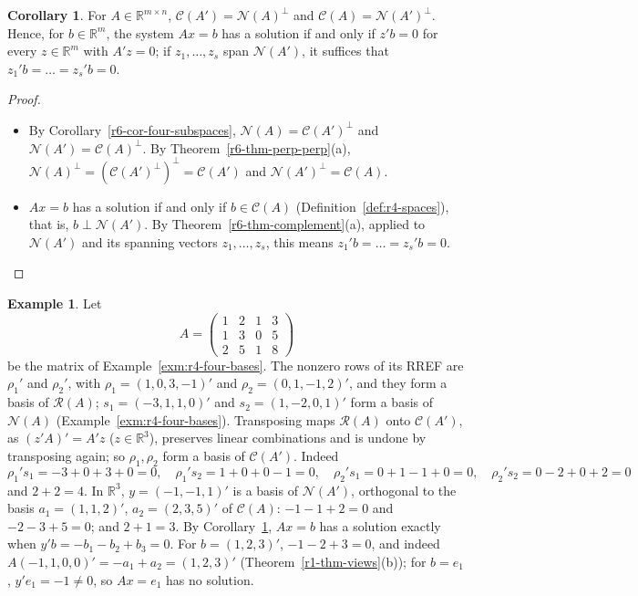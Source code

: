 \documentclass[12pt]{article}
\newcommand{\R}{\mathbb R}
\theoremstyle{definition}
\newtheorem{corollary}[theorem]{Corollary}
\newtheorem{example}[theorem]{Example}
\begin{document}
\begin{corollary}\label{r6-cor-consistency}
For \(A\in\R^{m\times n}\), \(\mathcal C(A')=\mathcal N(A)^\perp\) and \(\mathcal C(A)=\mathcal N(A')^\perp\). Hence,
for \(b\in\R^m\), the system \(Ax=b\) has a solution if and only if \(z'b=0\) for every \(z\in\R^m\) with
\(A'z=0\); if \(z_1,\dots,z_s\) span \(\mathcal N(A')\), it suffices that \(z_1'b=\dots=z_s'b=0\).
\end{corollary}
\begin{proof}
\begin{itemize}
\item By Corollary~\ref{r6-cor-four-subspaces}, \(\mathcal N(A)=\mathcal C(A')^\perp\) and
\(\mathcal N(A')=\mathcal C(A)^\perp\). By Theorem~\ref{r6-thm-perp-perp}(a),
\(\mathcal N(A)^\perp=(\mathcal C(A')^\perp)^\perp=\mathcal C(A')\) and \(\mathcal N(A')^\perp=\mathcal C(A)\).
\item \(Ax=b\) has a solution if and only if \(b\in\mathcal C(A)\) (Definition~\ref{def:r4-spaces}), that is,
\(b\perp\mathcal N(A')\). By Theorem~\ref{r6-thm-complement}(a), applied to \(\mathcal N(A')\) and its spanning
vectors \(z_1,\dots,z_s\), this means \(z_1'b=\dots=z_s'b=0\).\qedhere
\end{itemize}
\end{proof}

\begin{example}\label{r6-exm-four-subspaces}
Let
\[
A=\begin{pmatrix}1&2&1&3\\1&3&0&5\\2&5&1&8\end{pmatrix}
\]
be the matrix of Example~\ref{exm:r4-four-bases}. The nonzero rows of its RREF are \(\rho_1'\) and \(\rho_2'\), with
\(\rho_1=(1,0,3,-1)'\) and \(\rho_2=(0,1,-1,2)'\), and they form a basis of \(\mathcal R(A)\); \(s_1=(-3,1,1,0)'\) and
\(s_2=(1,-2,0,1)'\) form a basis of \(\mathcal N(A)\) (Example~\ref{exm:r4-four-bases}). Transposing maps
\(\mathcal R(A)\) onto \(\mathcal C(A')\), as \((z'A)'=A'z\) (\(z\in\R^3\)), preserves linear combinations and is undone
by transposing again; so \(\rho_1,\rho_2\) form a basis of \(\mathcal C(A')\). Indeed
\[
\rho_1's_1=-3+0+3+0=0,\quad \rho_1's_2=1+0+0-1=0,\quad \rho_2's_1=0+1-1+0=0,\quad \rho_2's_2=0-2+0+2=0
\]
and \(2+2=4\). In \(\R^3\), \(y=(-1,-1,1)'\) is a basis of \(\mathcal N(A')\), orthogonal to the basis
\(a_1=(1,1,2)'\), \(a_2=(2,3,5)'\) of \(\mathcal C(A)\): \(-1-1+2=0\) and \(-2-3+5=0\); and \(2+1=3\).
By Corollary~\ref{r6-cor-consistency}, \(Ax=b\) has a solution exactly when \(y'b=-b_1-b_2+b_3=0\). For
\(b=(1,2,3)'\), \(-1-2+3=0\), and indeed \(A(-1,1,0,0)'=-a_1+a_2=(1,2,3)'\)
(Theorem~\ref{r1-thm-views}(b)); for \(b=e_1\), \(y'e_1=-1\ne0\), so \(Ax=e_1\) has no solution.
\end{example}
\end{document}
